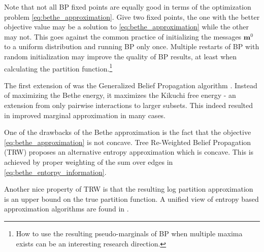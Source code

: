 Note that not all BP fixed points are equally good in terms of the optimization problem \eqref{eq:bethe_approximation}.
Give two fixed points, the one with the better objective value may be a solution to \eqref{eq:bethe_approximation} while the other may not.
This goes against the common practice of initializing the messages $\boldsymbol{m}^0$ to a uniform distribution and running BP only once.
Multiple restarts of BP with random initialization may improve the quality of BP results, at least when calculating the partition function.\footnote{How to use the resulting pseudo-marginals of BP when multiple maxima exists can be an interesting research direction.}

The first extension of  was the Generalized Belief Propagation algorithm  \cite{yedidia2000generalized}. 
Instead of maximizing the Bethe energy, it maximizes the Kikuchi free energy - an extension from only pairwise interactions to larger subsets. This 
indeed resulted in improved marginal approximation in many cases.


One of the drawbacks of the Bethe approximation is the fact that the objective \eqref{eq:bethe_approximation} is not concave.
Tree Re-Weighted Belief Propagation (TRW)  \cite{wainwright2003tree} proposes an alternative entropy approximation which is concave.
This is achieved by proper weighting of the sum over edges in \eqref{eq:bethe_entorpy_information}.
Another nice property of TRW is that the resulting log partition approximation is an upper bound on the true partition function. 
A unified view of entropy based approximation algorithms are found in \cite{meshi2009convexifying}.

